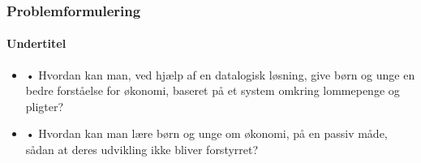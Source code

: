 
\begin{frame}
\frametitle{Problemformulering}
\framesubtitle{Undertitel} %
    \begin{itemize}
        \item{•	Hvordan kan man, ved hjælp af en datalogisk løsning, give børn og unge en bedre forståelse for økonomi, baseret på et system omkring lommepenge og pligter?}
        \pause
        \item{•	Hvordan kan man lære børn og unge om økonomi, på en passiv måde, sådan at deres udvikling ikke bliver forstyrret?}
    \end{itemize}
\end{frame}
   

